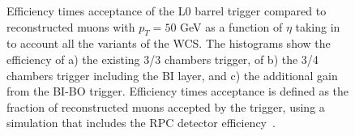 \begin{figure}[h]
	\centering
\end{figure}	
\begin{figure}[h]
	\centering
	\caption{Efficiency times acceptance of the L0 barrel trigger compared to reconstructed muons with $p_{T} = 50$ GeV as a function of $\eta$ taking in to account all the variants of the WCS. The histograms show the efficiency of a) the existing 3/3 chambers trigger, of b) the 3/4 chambers trigger including the BI layer, and c) the additional gain from the BI-BO trigger. Efficiency times acceptance is defined as the fraction of reconstructed muons accepted by the trigger, using a simulation that includes the RPC detector efficiency~\cite{Marcoccia:2693982}.}
	\label{fig:allcasesBMBO}
\end{figure}

